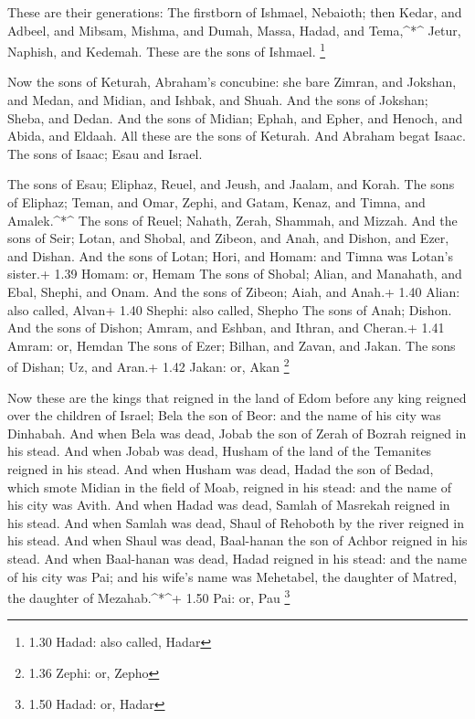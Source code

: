  These are their generations: The firstborn of Ishmael,
Nebaioth; then Kedar, and Adbeel, and Mibsam,  Mishma, and
Dumah, Massa, Hadad, and Tema,\^{}*\^{}  Jetur, Naphish,
and Kedemah. These are the sons of Ishmael. \footnote{1.30 Hadad: also
  called, Hadar}

 Now the sons of Keturah, Abraham's concubine: she bare
Zimran, and Jokshan, and Medan, and Midian, and Ishbak, and Shuah. And
the sons of Jokshan; Sheba, and Dedan.  And the sons of
Midian; Ephah, and Epher, and Henoch, and Abida, and Eldaah. All these
are the sons of Keturah.  And Abraham begat Isaac. The sons
of Isaac; Esau and Israel.

 The sons of Esau; Eliphaz, Reuel, and Jeush, and Jaalam,
and Korah.  The sons of Eliphaz; Teman, and Omar, Zephi,
and Gatam, Kenaz, and Timna, and Amalek.\^{}*\^{}  The sons
of Reuel; Nahath, Zerah, Shammah, and Mizzah.  And the sons
of Seir; Lotan, and Shobal, and Zibeon, and Anah, and Dishon, and Ezer,
and Dishan.  And the sons of Lotan; Hori, and Homam: and
Timna was Lotan's sister.+ 1.39 Homam: or, Hemam  The sons
of Shobal; Alian, and Manahath, and Ebal, Shephi, and Onam. And the sons
of Zibeon; Aiah, and Anah.+ 1.40 Alian: also called, Alvan+ 1.40 Shephi:
also called, Shepho  The sons of Anah; Dishon. And the sons
of Dishon; Amram, and Eshban, and Ithran, and Cheran.+ 1.41 Amram: or,
Hemdan  The sons of Ezer; Bilhan, and Zavan, and Jakan. The
sons of Dishan; Uz, and Aran.+ 1.42 Jakan: or, Akan \footnote{1.36
  Zephi: or, Zepho}

 Now these are the kings that reigned in the land of Edom
before any king reigned over the children of Israel; Bela the son of
Beor: and the name of his city was Dinhabah.  And when Bela
was dead, Jobab the son of Zerah of Bozrah reigned in his stead.
 And when Jobab was dead, Husham of the land of the
Temanites reigned in his stead.  And when Husham was dead,
Hadad the son of Bedad, which smote Midian in the field of Moab, reigned
in his stead: and the name of his city was Avith.  And when
Hadad was dead, Samlah of Masrekah reigned in his stead. 
And when Samlah was dead, Shaul of Rehoboth by the river reigned in his
stead.  And when Shaul was dead, Baal-hanan the son of
Achbor reigned in his stead.  And when Baal-hanan was dead,
Hadad reigned in his stead: and the name of his city was Pai; and his
wife's name was Mehetabel, the daughter of Matred, the daughter of
Mezahab.\^{}*\^{}+ 1.50 Pai: or, Pau \footnote{1.50 Hadad: or, Hadar}


